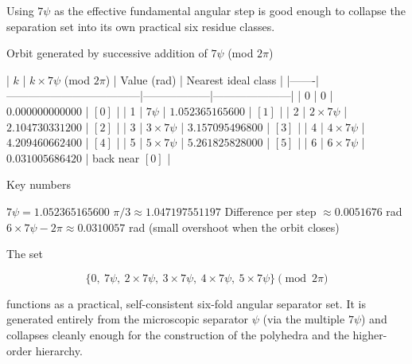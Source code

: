 Using \(7\psi\) as the effective fundamental angular step is good enough to collapse the separation set into its own practical six residue classes.

Orbit generated by successive addition of \(7\psi\) (mod \(2\pi\))

| \(k\) | \(k \times 7\psi\) (mod \(2\pi\)) | Value (rad)      | Nearest ideal class |
|-------|------------------------------------|------------------|---------------------|
| 0     | \(0\)                              | \(0.000000000000\) | \([0]\)            |
| 1     | \(7\psi\)                          | \(1.052365165600\) | \([1]\)            |
| 2     | \(2\times 7\psi\)                  | \(2.104730331200\) | \([2]\)            |
| 3     | \(3\times 7\psi\)                  | \(3.157095496800\) | \([3]\)            |
| 4     | \(4\times 7\psi\)                  | \(4.209460662400\) | \([4]\)            |
| 5     | \(5\times 7\psi\)                  | \(5.261825828000\) | \([5]\)            |
| 6     | \(6\times 7\psi\)                  | \(0.031005686420\) | back near \([0]\)  |

Key numbers

\(7\psi = 1.052365165600\)
\(\pi/3 \approx 1.047197551197\)
Difference per step \(\approx 0.0051676\) rad
\(6 \times 7\psi - 2\pi \approx 0.0310057\) rad  
  (small overshoot when the orbit closes)

The set  

\[
\{0,\ 7\psi,\ 2\times 7\psi,\ 3\times 7\psi,\ 4\times 7\psi,\ 5\times 7\psi\} \pmod{2\pi}
\]

functions as a practical, self-consistent six-fold angular separator set. It is generated entirely from the microscopic separator \(\psi\) (via the multiple \(7\psi\)) and collapses cleanly enough for the construction of the polyhedra and the higher-order hierarchy.
